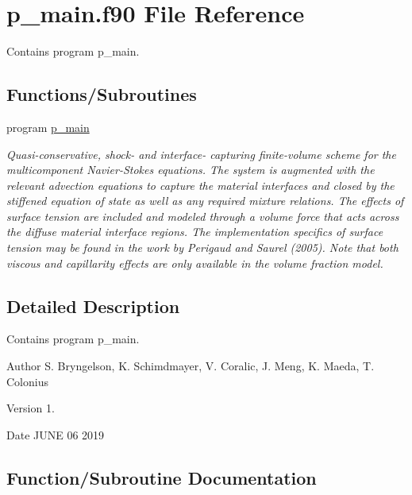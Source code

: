 \hypertarget{p__main_8f90}{}\section{p\+\_\+main.\+f90 File Reference}
\label{p__main_8f90}


Contains program p\+\_\+main.  


\subsection*{Functions/\+Subroutines}
\begin{DoxyCompactItemize}
\item 
program \hyperlink{p__main_8f90_aeec10ee8e2940c953967da3e374e1579}{p\+\_\+main}
\begin{DoxyCompactList}\small\item\em Quasi-\/conservative, shock-\/ and interface-\/ capturing finite-\/volume scheme for the multicomponent Navier-\/\+Stokes equations. The system is augmented with the relevant advection equations to capture the material interfaces and closed by the stiffened equation of state as well as any required mixture relations. The effects of surface tension are included and modeled through a volume force that acts across the diffuse material interface regions. The implementation specifics of surface tension may be found in the work by Perigaud and Saurel (2005). Note that both viscous and capillarity effects are only available in the volume fraction model. \end{DoxyCompactList}\end{DoxyCompactItemize}


\subsection{Detailed Description}
Contains program p\+\_\+main. 

\begin{DoxyAuthor}{Author}
S. Bryngelson, K. Schimdmayer, V. Coralic, J. Meng, K. Maeda, T. Colonius 
\end{DoxyAuthor}
\begin{DoxyVersion}{Version}
1. 
\end{DoxyVersion}
\begin{DoxyDate}{Date}
J\+U\+NE 06 2019 
\end{DoxyDate}


\subsection{Function/\+Subroutine Documentation}
\mbox{\label{p__main_8f90_aeec10ee8e2940c953967da3e374e1579}} 
